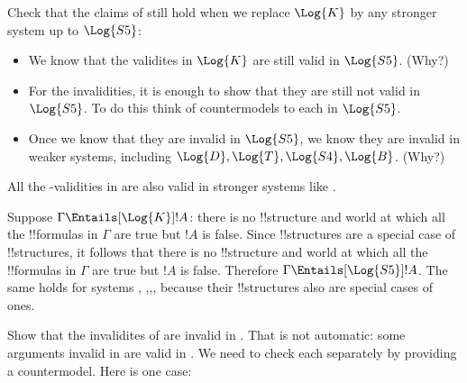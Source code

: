 \documentclass[../../../include/open-logic-section]{subfiles}
\begin{document}
\begin{prob}
    Check that the claims of  still hold when we
    replace $\Log{K}$ by any stronger system up to $\Log{S5}$:
    \begin{itemize}
        \item We know that the validites in $\Log{K}$ are still valid 
        in $\Log{S5}$. (Why?)
        \item For the invalidities, it is enough to show that they are
        still not valid in $\Log{S5}$. To do this think of countermodels
        to each in $\Log{S5}$.
        \item Once we know that they are invalid in $\Log{S5}$, we know
        they are invalid in weaker systems, including
         $\Log{D},\Log{T},\Log{S4},\Log{B}$. (Why?)
    \end{itemize}

    \begin{ans}
    All the -validities in  are also valid in
    stronger systems like .

    Suppose $\Gamma\Entails[\Log{K}]!A$: there is no 
    !!{structure} and world at which all the !!{formula}s in $\Gamma$
    are true but $!A$ is false. Since  !!{structure}s are a
    special case of  !!{structure}s, it follows that there is
    no   !!{structure} and world at which all the !!{formula}s
    in $\Gamma$ are true but $!A$ is false. Therefore
    $\Gamma\Entails[\Log{S5}]!A$. The same holds for systems ,
    ,,, because their !!{structure}s also are 
    special cases of  ones.

    Show that the invalidites of  are invalid in
    . That is not automatic: some arguments invalid in 
    are valid in . We need to check each separately
    by providing a  countermodel. Here is one case:
    

\end{ans}
\end{prob}
\end{document}
